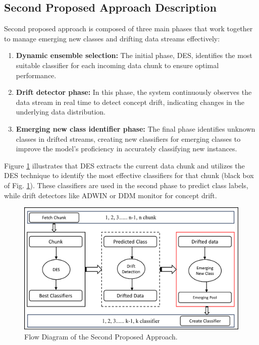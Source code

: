 \subsection{Second Proposed Approach Description}
\label{proposed_overview}
Second proposed approach is composed of three main phases that work together to manage emerging new classes and drifting data streams effectively:
\begin{enumerate}
	\item \textbf{Dynamic ensemble selection:} The initial phase, DES, identifies the most suitable classifier for each incoming data chunk to ensure optimal performance.
	\item \textbf{Drift detector phase:} In this phase, the system continuously observes the data stream in real time to detect concept drift, indicating changes in the underlying data distribution.
	\item \textbf{Emerging new class identifier phase:} The final phase identifies unknown classes in drifted streams, creating new classifiers for emerging classes to improve the model's proficiency in accurately classifying new instances.
\end{enumerate}
Figure \ref{fig:proposal_step_1} illustrates that DES extracts the current data chunk and utilizes the DES technique to identify the most effective classifiers for that chunk (black box of Fig. \ref{fig:proposal_step_1}). These classifiers are used in the second phase to predict class labels, while drift detectors like ADWIN or DDM monitor for concept drift.
\vspace{-3mm}
\begin{figure}[H]
	\centering
	\includegraphics[width=0.78\linewidth]{5_Emerging/images/pro1.png}
	\caption{Flow Diagram of the Second Proposed Approach.}
	\label{fig:proposal_step_1}
\end{figure}
\vspace{-3mm}
